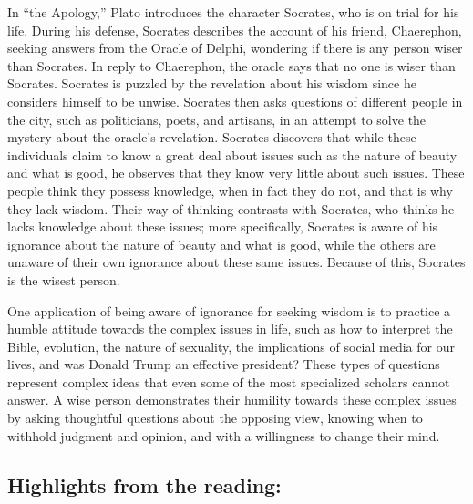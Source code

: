 \documentclass[
]{book}
\begin{document}
In ``the Apology,'' Plato introduces the character Socrates, who is on trial for his life. During his defense, Socrates describes the account of his friend, Chaerephon, seeking answers from the Oracle of Delphi, wondering if there is any person wiser than Socrates. In reply to Chaerephon, the oracle says that no one is wiser than Socrates. Socrates is puzzled by the revelation about his wisdom since he considers himself to be unwise. Socrates then asks questions of different people in the city, such as politicians, poets, and artisans, in an attempt to solve the mystery about the oracle's revelation. Socrates discovers that while these individuals claim to know a great deal about issues such as the nature of beauty and what is good, he observes that they know very little about such issues. These people think they possess knowledge, when in fact they do not, and that is why they lack wisdom. Their way of thinking contrasts with Socrates, who thinks he lacks knowledge about these issues; more specifically, Socrates is aware of his ignorance about the nature of beauty and what is good, while the others are unaware of their own ignorance about these same issues. Because of this, Socrates is the wisest person.

One application of being aware of ignorance for seeking wisdom is to practice a humble attitude towards the complex issues in life, such as how to interpret the Bible, evolution, the nature of sexuality, the implications of social media for our lives, and was Donald Trump an effective president? These types of questions represent complex ideas that even some of the most specialized scholars cannot answer. A wise person demonstrates their humility towards these complex issues by asking thoughtful questions about the opposing view, knowing when to withhold judgment and opinion, and with a willingness to change their mind.

\hypertarget{highlights-from-the-reading-1}{%
\subsection{Highlights from the reading:}\label{highlights-from-the-reading-1}}
\end{document}
